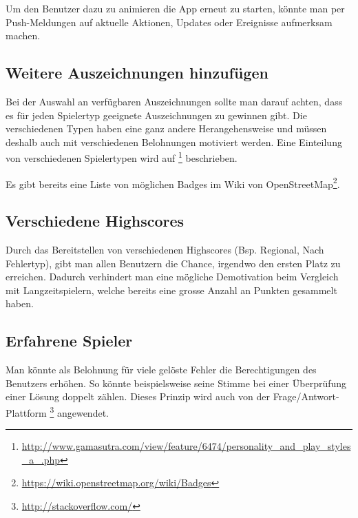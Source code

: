 Um den Benutzer dazu zu animieren die App erneut zu starten, könnte man per Push-Meldungen auf aktuelle Aktionen, Updates oder Ereignisse aufmerksam machen.

\subsection{Weitere Auszeichnungen hinzufügen}
Bei der Auswahl an verfügbaren Auszeichnungen sollte man darauf achten, dass es für jeden Spielertyp geeignete Auszeichnungen zu gewinnen gibt.
Die verschiedenen Typen haben eine ganz andere Herangehensweise und müssen deshalb auch mit verschiedenen Belohnungen motiviert werden.
Eine Einteilung von verschiedenen Spielertypen wird auf \footnote{\url{http://www.gamasutra.com/view/feature/6474/personality_and_play_styles_a_.php}} beschrieben.

Es gibt bereits eine Liste von möglichen Badges im Wiki von OpenStreetMap\footnote{\url{https://wiki.openstreetmap.org/wiki/Badges}}.

\subsection{Verschiedene Highscores}
Durch das Bereitstellen von verschiedenen Highscores (Bsp. Regional, Nach Fehlertyp), gibt man allen Benutzern die Chance, irgendwo den ersten Platz zu erreichen.
Dadurch verhindert man eine mögliche Demotivation beim Vergleich mit Langzeitspielern, welche bereits eine grosse Anzahl an Punkten gesammelt haben.

\subsection{Erfahrene Spieler}
Man könnte als Belohnung für viele gelöste Fehler die Berechtigungen des Benutzers erhöhen.
So könnte beispielsweise seine Stimme bei einer Überprüfung einer Lösung doppelt zählen.
Dieses Prinzip wird auch von der Frage/Antwort-Plattform \footnote{\url{http://stackoverflow.com/}} angewendet.

